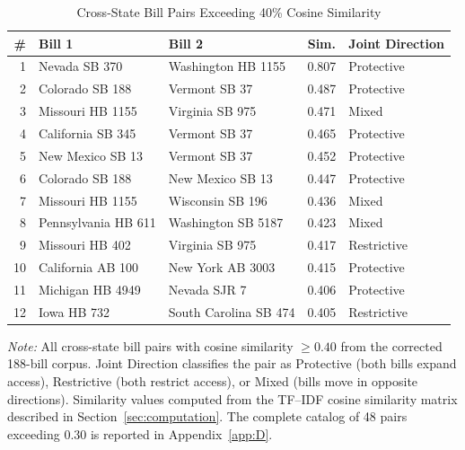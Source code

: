 \begin{table}[H]
\centering
\caption{Cross-State Bill Pairs Exceeding 40\% Cosine Similarity}
\label{tab:high_sim}
\begin{threeparttable}
\begin{tabular}{rllcl}
\toprule
\# & Bill 1 & Bill 2 & Sim. & Joint Direction \\
\midrule
1  & Nevada SB 370        & Washington HB 1155   & 0.807 & Protective  \\
2  & Colorado SB 188      & Vermont SB 37        & 0.487 & Protective  \\
3  & Missouri HB 1155     & Virginia SB 975      & 0.471 & Mixed       \\
4  & California SB 345    & Vermont SB 37        & 0.465 & Protective  \\
5  & New Mexico SB 13     & Vermont SB 37        & 0.452 & Protective  \\
6  & Colorado SB 188      & New Mexico SB 13     & 0.447 & Protective  \\
7  & Missouri HB 1155     & Wisconsin SB 196     & 0.436 & Mixed       \\
8  & Pennsylvania HB 611  & Washington SB 5187   & 0.423 & Mixed       \\
9  & Missouri HB 402      & Virginia SB 975      & 0.417 & Restrictive \\
10 & California AB 100    & New York AB 3003     & 0.415 & Protective  \\
11 & Michigan HB 4949     & Nevada SJR 7         & 0.406 & Protective  \\
12 & Iowa HB 732          & South Carolina SB 474 & 0.405 & Restrictive \\
\bottomrule
\end{tabular}
\begin{tablenotes}
\footnotesize
\item \textit{Note:} All cross-state bill pairs with cosine similarity $\geq 0.40$
  from the corrected 188-bill corpus. Joint Direction classifies the pair as
  Protective (both bills expand access), Restrictive (both restrict access),
  or Mixed (bills move in opposite directions). Similarity values computed from
  the TF--IDF cosine similarity matrix described in Section~\ref{sec:computation}.
  The complete catalog of 48 pairs exceeding 0.30 is reported in
  Appendix~\ref{app:D}.
\end{tablenotes}
\end{threeparttable}
\end{table}

